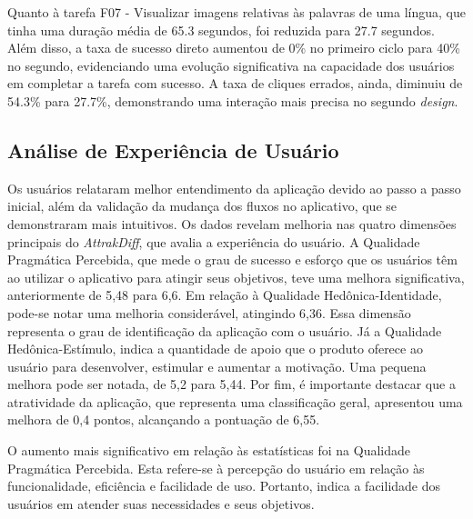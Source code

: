 Quanto à tarefa F07 - Visualizar imagens relativas às palavras de uma língua, que tinha uma duração média de 65.3 segundos, foi reduzida para 27.7 segundos. Além disso, a taxa de sucesso direto aumentou de 0\% no primeiro ciclo para 40\% no segundo, evidenciando uma evolução 
significativa na capacidade dos usuários em completar a tarefa com sucesso. A taxa de cliques errados, ainda, diminuiu de 54.3\% para 27.7\%, demonstrando uma interação mais precisa no segundo \textit{design}.

\subsection{Análise de Experiência de Usuário}
\label{sec:Análise de Experiência de Usuário}

Os usuários relataram melhor entendimento da aplicação devido ao passo a passo inicial, além da validação da mudança dos fluxos no aplicativo, que se demonstraram mais intuitivos. Os dados revelam melhoria nas quatro dimensões principais do \textit{AttrakDiff}, 
que avalia a experiência do usuário. A Qualidade Pragmática Percebida, que mede o grau de sucesso e esforço que os usuários têm ao utilizar o aplicativo para atingir seus objetivos, teve uma melhora significativa, anteriormente de 5,48 para 6,6. Em relação à 
Qualidade Hedônica-Identidade, pode-se notar uma melhoria considerável, atingindo 6,36. Essa dimensão representa o grau de identificação da aplicação com o usuário. Já a Qualidade Hedônica-Estímulo, indica a quantidade de apoio que o produto oferece ao usuário 
para desenvolver, estimular e aumentar a motivação. Uma pequena melhora pode ser notada, de 5,2 para 5,44. Por fim, é importante destacar que a atratividade da aplicação, que representa uma classificação geral, apresentou uma melhora de 0,4 pontos, alcançando a 
pontuação de 6,55.

O aumento mais significativo em relação às estatísticas foi na Qualidade Pragmática Percebida. Esta refere-se à percepção do usuário em relação às funcionalidade, eficiência e facilidade de uso. Portanto, indica a facilidade dos usuários em atender suas necessidades e 
seus objetivos.